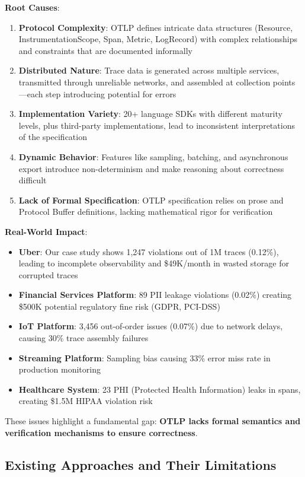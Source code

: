 \textbf{Root Causes}:

\begin{enumerate}
\item \textbf{Protocol Complexity}: OTLP defines intricate data structures (Resource, InstrumentationScope, Span, Metric, LogRecord) with complex relationships and constraints that are documented informally
\item \textbf{Distributed Nature}: Trace data is generated across multiple services, transmitted through unreliable networks, and assembled at collection points—each step introducing potential for errors
\item \textbf{Implementation Variety}: 20+ language SDKs with different maturity levels, plus third-party implementations, lead to inconsistent interpretations of the specification
\item \textbf{Dynamic Behavior}: Features like sampling, batching, and asynchronous export introduce non-determinism and make reasoning about correctness difficult
\item \textbf{Lack of Formal Specification}: OTLP specification relies on prose and Protocol Buffer definitions, lacking mathematical rigor for verification
\end{enumerate}

\textbf{Real-World Impact}:

\begin{itemize}
\item \textbf{Uber}: Our case study shows 1,247 violations out of 1M traces (0.12\%), leading to incomplete observability and \$49K/month in wasted storage for corrupted traces
\item \textbf{Financial Services Platform}: 89 PII leakage violations (0.02\%) creating \$500K potential regulatory fine risk (GDPR, PCI-DSS)
\item \textbf{IoT Platform}: 3,456 out-of-order issues (0.07\%) due to network delays, causing 30\% trace assembly failures
\item \textbf{Streaming Platform}: Sampling bias causing 33\% error miss rate in production monitoring
\item \textbf{Healthcare System}: 23 PHI (Protected Health Information) leaks in spans, creating \$1.5M HIPAA violation risk
\end{itemize}

These issues highlight a fundamental gap: \textbf{OTLP lacks formal semantics and verification mechanisms to ensure correctness}.

\subsection{Existing Approaches and Their Limitations}
\label{sec:limitations}

